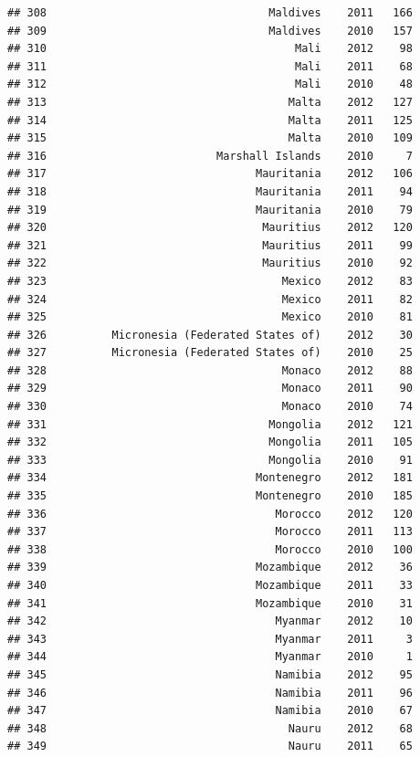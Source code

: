 \documentclass[
]{book}
\begin{document}
\begin{verbatim}
## 308                                  Maldives    2011   166
## 309                                  Maldives    2010   157
## 310                                      Mali    2012    98
## 311                                      Mali    2011    68
## 312                                      Mali    2010    48
## 313                                     Malta    2012   127
## 314                                     Malta    2011   125
## 315                                     Malta    2010   109
## 316                          Marshall Islands    2010     7
## 317                                Mauritania    2012   106
## 318                                Mauritania    2011    94
## 319                                Mauritania    2010    79
## 320                                 Mauritius    2012   120
## 321                                 Mauritius    2011    99
## 322                                 Mauritius    2010    92
## 323                                    Mexico    2012    83
## 324                                    Mexico    2011    82
## 325                                    Mexico    2010    81
## 326          Micronesia (Federated States of)    2012    30
## 327          Micronesia (Federated States of)    2010    25
## 328                                    Monaco    2012    88
## 329                                    Monaco    2011    90
## 330                                    Monaco    2010    74
## 331                                  Mongolia    2012   121
## 332                                  Mongolia    2011   105
## 333                                  Mongolia    2010    91
## 334                                Montenegro    2012   181
## 335                                Montenegro    2010   185
## 336                                   Morocco    2012   120
## 337                                   Morocco    2011   113
## 338                                   Morocco    2010   100
## 339                                Mozambique    2012    36
## 340                                Mozambique    2011    33
## 341                                Mozambique    2010    31
## 342                                   Myanmar    2012    10
## 343                                   Myanmar    2011     3
## 344                                   Myanmar    2010     1
## 345                                   Namibia    2012    95
## 346                                   Namibia    2011    96
## 347                                   Namibia    2010    67
## 348                                     Nauru    2012    68
## 349                                     Nauru    2011    65

\end{verbatim}
\end{document}
